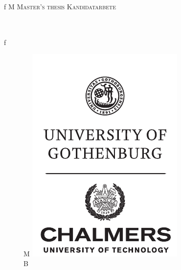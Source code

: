 { %
\newpage
\thispagestyle{empty}
\begin{center}
	\if\thesisStatus f
		\textsc{\large
		\if\thesisType M
			Master's thesis
		\else
			Kandidatarbete
		\fi
		\thesisYear
		}
	\else
		\mbox{}
	\fi
	\\[4cm]
	\textbf{\Large \thesisTitle} \\[1cm]
	{\large \thesisSubtitle}\\[1cm]
	{\large \thesisAuthor}

	\if\thesisStatus f
		\vfill
		\begin{figure}[H]
		\centering
		\if\thesisType M
		\includegraphics[width=0.25\pdfpagewidth]{template/figures/ChGULogoHog.pdf} \\
		\fi
		\if\thesisType B

\end{figure}
\end{center}}
